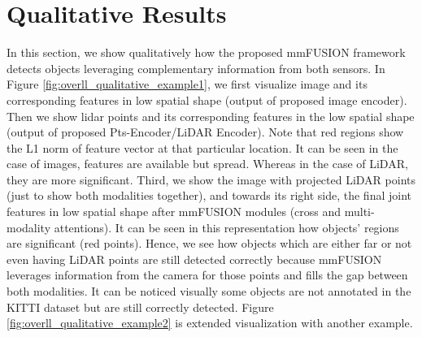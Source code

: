 \documentclass[10pt,twocolumn,letterpaper]{article}
\begin{document}
\section{Qualitative Results}
In this section, we show qualitatively how the proposed mmFUSION framework detects objects leveraging complementary information from both sensors. In Figure \ref{fig:overll_qualitative_example1}, we first visualize image and its corresponding features in low spatial shape (output of proposed image encoder). Then we show lidar points and its corresponding features in the low spatial shape (output of proposed Pts-Encoder/LiDAR Encoder). Note that red regions show the L1 norm  of feature vector at that particular location. It can be seen in the case of images, features are available but spread. Whereas in the case of LiDAR, they are more significant. Third, we show the image with projected LiDAR points (just to show both modalities together), and towards its right side, the final joint features in low spatial shape after mmFUSION modules (cross and multi-modality attentions). It can be seen in this representation how objects' regions are significant (red points). Hence, we see how objects which are either far or not even having LiDAR points are still detected correctly because mmFUSION leverages information from the camera for those points and fills the gap between both modalities. It can be noticed visually some objects are not annotated in the KITTI dataset but are still correctly detected. Figure \ref{fig:overll_qualitative_example2} is extended visualization with another example.



{\small \newpage \newpage


}
\end{document}
